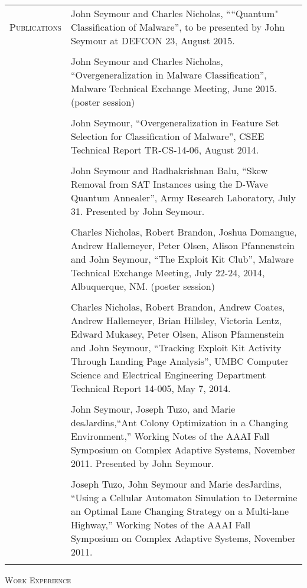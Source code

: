 \begin{tabular}{l p{340pt}}
\textsc{Publications}
& John Seymour and Charles Nicholas, ````Quantum" Classification of Malware'', to be presented by John Seymour at DEFCON 23, August 2015.\\ \\
& John Seymour and Charles Nicholas, ``Overgeneralization in Malware Classification'', Malware Technical Exchange Meeting, June 2015. (poster session)\\ \\
& John Seymour, ``Overgeneralization in Feature Set Selection for Classification of Malware'', CSEE Technical Report TR-CS-14-06, August 2014.\\ \\
& John Seymour and Radhakrishnan Balu, ``Skew Removal from SAT Instances using the D-Wave Quantum Annealer'', Army Research Laboratory, July 31. Presented by John Seymour.\\ \\
& Charles Nicholas, Robert Brandon, Joshua Domangue, Andrew Hallemeyer, Peter Olsen, Alison Pfannenstein and John Seymour, ``The Exploit Kit Club'', Malware Technical Exchange Meeting, July 22-24, 2014, Albuquerque, NM.  (poster session)\\ \\
& Charles Nicholas, Robert Brandon, Andrew Coates, Andrew Hallemeyer, Brian Hillsley, Victoria Lentz, Edward Mukasey, Peter Olsen, Alison Pfannenstein and John Seymour, ``Tracking Exploit Kit Activity Through Landing Page Analysis'', UMBC Computer Science and Electrical Engineering Department Technical Report 14-005, May 7, 2014.\\ \\
& John Seymour, Joseph Tuzo, and Marie desJardins,``Ant Colony Optimization in a Changing Environment,'' Working Notes of the AAAI Fall Symposium on Complex Adaptive Systems, November 2011.  Presented by John Seymour.\\ \\
& Joseph Tuzo, John Seymour and Marie desJardins,  ``Using a Cellular Automaton Simulation to Determine an Optimal Lane Changing Strategy on a Multi-lane Highway,'' Working Notes of the AAAI Fall Symposium on Complex Adaptive Systems, November 2011.\\ \\

\end{tabular}

\pagebreak
\textsc{Work Experience}

